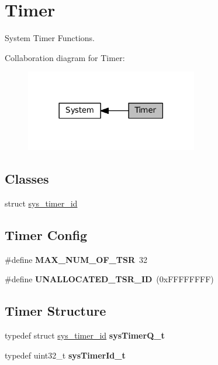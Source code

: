 \hypertarget{group__SYSTEM__TIMER}{}\section{Timer}
\label{group__SYSTEM__TIMER}


System Timer Functions.  


Collaboration diagram for Timer\+:\nopagebreak
\begin{figure}[H]
\begin{center}
\leavevmode
\includegraphics[width=213pt]{group__SYSTEM__TIMER}
\end{center}
\end{figure}
\subsection*{Classes}
\begin{DoxyCompactItemize}
\item 
struct \hyperlink{structsys__timer__id}{sys\+\_\+timer\+\_\+id}
\end{DoxyCompactItemize}
\subsection*{Timer Config}
\begin{DoxyCompactItemize}
\item 
\mbox{\label{group__SYSTEM__TIMER_gad99ad563a1a632fde508ad8be6422e57}} 
\#define {\bfseries M\+A\+X\+\_\+\+N\+U\+M\+\_\+\+O\+F\+\_\+\+T\+SR}~32
\item 
\mbox{\label{group__SYSTEM__TIMER_ga3ab2d3270619515d0cfdc5caf09d6366}} 
\#define {\bfseries U\+N\+A\+L\+L\+O\+C\+A\+T\+E\+D\+\_\+\+T\+S\+R\+\_\+\+ID}~(0x\+F\+F\+F\+F\+F\+F\+F\+F)
\end{DoxyCompactItemize}
\subsection*{Timer Structure}
\begin{DoxyCompactItemize}
\item 
\mbox{\label{group__SYSTEM__TIMER_ga0964d5651c1e8775bdedb28ad089d8b9}} 
typedef struct \hyperlink{structsys__timer__id}{sys\+\_\+timer\+\_\+id} {\bfseries sys\+Timer\+Q\+\_\+t}
\item 
\mbox{\label{group__SYSTEM__TIMER_ga45dfe75dba9f4d77371435e6ea122117}} 
typedef uint32\+\_\+t {\bfseries sys\+Timer\+Id\+\_\+t}
\end{DoxyCompactItemize}
